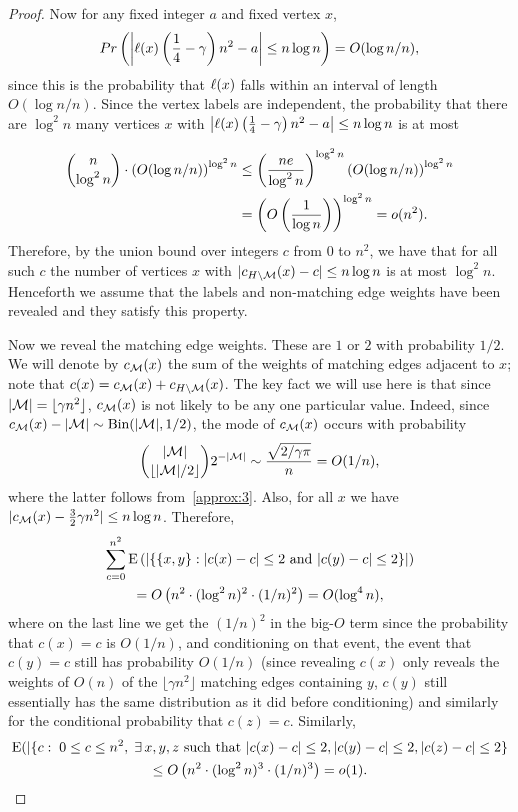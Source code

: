\documentclass[12pt,reqno]{amsart}
\begin{document}
\begin{proof}
Now for any fixed integer $a$ and fixed vertex $x$, 
\[
Pr\left(\left|\ell(x) \left( \frac 14 - \gamma \right)n^2 - a\right|\le  n \log n\right) = O(\log n /n),
\]
since this is the probability that $\ell(x)$ falls within an interval of length $O(\log n /n)$. Since the vertex labels are independent, the probability that there are $\log^2 n$ many vertices $x$ with $\left|\ell(x) \left( \frac 14 - \gamma \right)n^2 - a\right|\le  n \log n$ is at most 

\begin{align*}
\binom{n}{\log^2 n} \cdot \left( O(\log n /n) \right)^{\log^2 n} &\le \left( \frac{ne}{\log^2 n} \right)^{\log^2 n}\left( O(\log n /n) \right)^{\log^2 n}\\
& = \left( O\left( \frac{1}{\log n} \right) \right)^{\log^2 n} =o(n^2).
\end{align*}
Therefore, by the union bound over integers $c$ from $0$ to $n^2$, we have that for all such $c$  the number of vertices $x$ with $|c_{H \setminus \mathcal{M}}(x) - c| \le n \log n$ is at most $ \log^2 n$. Henceforth we assume that the labels and non-matching edge weights have been revealed and they satisfy this property. 

Now we reveal the matching edge weights. These are $1$ or $2$ with probability $1/2$. We will denote by $c_{\mathcal{M}}(x)$ the sum of the weights of matching edges adjacent to $x$; note that $c(x) = c_{\mathcal{M}}(x) + c_{H \setminus \mathcal{M}}(x)$. The key fact we will use here is that since $|\mathcal{M}| = \lfloor \gamma n^2\rfloor$, $c_{\mathcal{M}}(x)$ is not likely to be any one particular value. Indeed, since $c_{\mathcal{M}}(x)-|\mathcal{M}| \sim \textrm{Bin}(|\mathcal{M}|, 1/2)$,
the mode of $c_{\mathcal{M}}(x)$ occurs with probability 
\[
\binom{|\mathcal{M}|}{\lfloor |\mathcal{M}|/2 \rfloor} 2^{-|\mathcal{M}|} \sim \frac{\sqrt{2/\gamma \pi}}{ n }= O(1/n),
\]
where the latter follows from~\ref{approx:3}.
Also, \whp for all $x$ we have $|c_{\mathcal{M}}(x) - \frac 32 \gamma n^2| \le n \log n$. Therefore, 
\begin{multline*}
\sum_{c=0}^{n^2}\mathrm{E}\left(\left|\left\{ \{x, y\}: |c(x)-c|\le 2 \text{ and }  |c(y)-c| \le 2  \right\}\right|\right) \\
= O\left( n^2 \cdot (\log^2 n )^2 \cdot (1/n)^2 \right) = O(\log^4 n),
\end{multline*}
where on the last line we get the $(1/n)^2$ in the big-$O$ term since the probability that $c(x)=c$ is $O(1/n)$, and conditioning on that event, the event that $c(y)=c$ still has probability $O(1/n)$ (since revealing $c(x)$ only reveals the weights of $O(n)$ of the $\lfloor \gamma n^2\rfloor$ matching edges containing $y$, $c(y)$ still essentially has the same distribution as it did before conditioning) and similarly for the conditional probability that $c(z)=c$. Similarly,
\begin{multline*}
\mathrm{E}(|\{c: \; 0 \le c \le n^2, \; \exists\, x, y, z \mbox{ such that } |c(x)-c|\le 2,  |c(y)-c|\le 2, |c(z)-c| \le 2\} \\
\le O\left( n^2 \cdot (\log^2 n )^3 \cdot (1/n)^3 \right) = o(1).
\end{multline*}


\end{proof}
\end{document}
